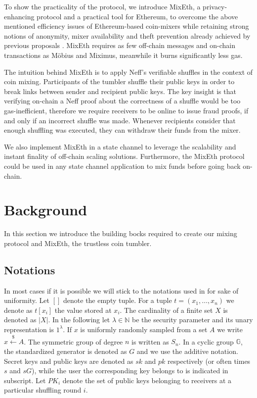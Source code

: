 \documentclass[a4paper,UKenglish,cleveref, autoref]{oasics-v2019}
\begin{document}
To show the practicality of the protocol, we introduce MixEth, a privacy-enhancing protocol and a practical tool for Ethereum, to overcome the above mentioned efficiency issues of Ethereum-based coin-mixers while retaining strong notions of anonymity, mixer availability and theft prevention already achieved by previous proposals \cite{meiklejohn2018mobius,miximus2018}. MixEth requires as few off-chain messages and on-chain transactions as Möbius and Miximus, meanwhile it burns significantly less gas.

The intuition behind MixEth is to apply Neff's verifiable shuffles \cite{neff2001verifiable} in the context of coin mixing. Participants of the tumbler shuffle their public keys in order to break links between sender and recipient public keys. The key insight is that verifying on-chain a Neff proof about the correctness of a shuffle would be too gas-inefficient, therefore we require receivers to be online to issue fraud proofs, if and only if an incorrect shuffle was made. Whenever recipients consider that enough shuffling was executed, they can withdraw their funds from the mixer. 

We also implement MixEth in a state channel to leverage the scalability and instant finality of off-chain scaling solutions. Furthermore, the MixEth protocol could be used in any state channel application to mix funds before going back on-chain. 


\section{Background}
In this section we introduce the building bocks required to create our mixing protocol and MixEth, the trustless coin tumbler.
\subsection{Notations}
In most cases if it is possible we will stick to the notations used in \cite{meiklejohn2018mobius} for sake of uniformity. 
Let $[]$ denote the empty tuple. For a tuple $t=(x_1,\dots,x_n)$ we denote as $t[x_i]$ the value stored at $x_{i}$. The cardinality of a finite set $X$ is denoted as $|X|$. In the following let $\lambda \in \mathbb{N}$ be the security parameter and its unary representation is $1^{\lambda}$. If $x$ is uniformly randomly sampled from a set $A$ we write $x\stackrel{\$}{\leftarrow}A$. The symmetric group of degree $n$ is written as ${S}_n$. In a cyclic group $\mathbb{G}$, the standardized generator is denoted as $G$ and we use the additive notation. Secret keys and public keys are denoted as $sk$ and $pk$ respectively (or often times $s$ and $sG$), while the user the corresponding key belongs to is indicated in subscript. Let $PK_{i}$ denote the set of public keys belonging to receivers at a particular shuffling round $i$.
\end{document}
